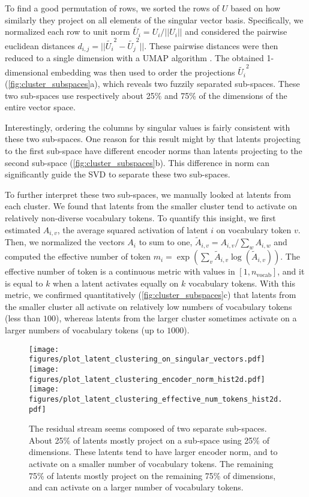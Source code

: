 To find a good permutation of rows, we sorted the rows of $U$ based on how similarly they project on all elements of the singular vector basis. Specifically, we normalized each row to unit norm $\tilde{U_i} = U_i / ||U_i||$ and considered the pairwise euclidean distances $d_{i,j} = ||\tilde{U_i}^2 - \tilde{U_j}^2||$. These pairwise distances were then reduced to a single dimension with a UMAP algorithm \citep{mcinnes2018umap}. The obtained 1-dimensional embedding was then used to order the projections $\tilde{U_i}^2$ (\autoref{fig:cluster_subspaces}a), which reveals two fuzzily separated sub-spaces. These two sub-spaces use respectively about 25\% and 75\% of the dimensions of the entire vector space.

Interestingly, ordering the columns by singular values is fairly consistent with these two sub-spaces. One reason for this result might by that latents projecting to the first sub-space have different encoder norms than latents projecting to the second sub-space (\autoref{fig:cluster_subspaces}b). This difference in norm can significantly guide the SVD to separate these two sub-spaces.

To further interpret these two sub-spaces, we manually looked at latents from each cluster. We found that latents from the smaller cluster tend to activate on relatively non-diverse vocabulary tokens. To quantify this insight, we first estimated $A_{i,v}$, the average squared activation of latent $i$ on vocabulary token $v$. Then, we normalized the vectors $A_{i}$ to sum to one, $\tilde{A}_{i,v} = A_{i,v} / \sum_w A_{i,w}$ and computed the effective number of token $m_i = \exp(\sum_v \tilde{A}_{i,v} \log(\tilde{A}_{i,v}))$. The effective number of token is a continuous metric with values in $[1, n_\text{vocab}]$, and it is equal to $k$ when a latent activates equally on $k$ vocabulary tokens. With this metric, we confirmed quantitatively (\autoref{fig:cluster_subspaces}c) that latents from the smaller cluster all activate on relatively low numbers of vocabulary tokens (less than $100$), whereas latents from the larger cluster sometimes activate on a larger numbers of vocabulary tokens (up to $1000$).

\begin{figure}
    \centering
    \texttt{[image: figures/plot\_latent\_clustering\_on\_singular\_vectors.pdf]}
    \texttt{[image: figures/plot\_latent\_clustering\_encoder\_norm\_hist2d.pdf]}
    \texttt{[image: figures/plot\_latent\_clustering\_effective\_num\_tokens\_hist2d.pdf]}

    
    \caption{The residual stream seems composed of two separate sub-spaces. About 25\% of latents mostly project on a sub-space using 25\% of dimensions. These latents tend to have larger encoder norm, and to activate on a smaller number of vocabulary tokens. The remaining 75\% of latents mostly project on the remaining 75\% of dimensions, and can activate on a larger number of vocabulary tokens.}
    \label{fig:cluster_subspaces}
\end{figure}


\fi

